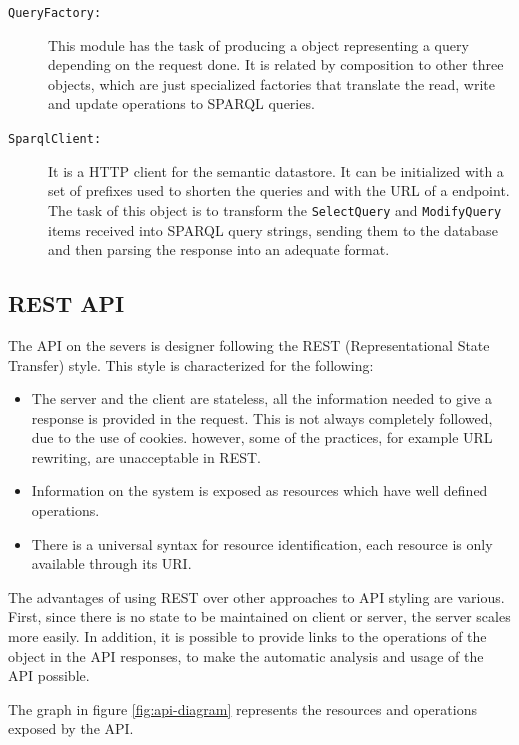 \begin{description}
\item[\texttt{QueryFactory:}] This module has the task of producing a object representing a query depending on the request done. It is related by composition to other three objects, which are just specialized factories that translate the read, write and update operations to SPARQL queries.

\item[\texttt{SparqlClient:}] It is a HTTP client for the semantic datastore. It can be initialized with a set of prefixes used to shorten the queries and with the URL of a endpoint. The task of this object is to transform the \texttt{SelectQuery} and \texttt{ModifyQuery} items received into SPARQL query strings, sending them to the database and then parsing the response into an adequate format.
\end{description}

\FloatBarrier

\subsection{REST API}\label{ssec:api}

The API on the severs is designer following the REST (Representational State Transfer)\cite{rest} style. This style is characterized for the following:

\begin{itemize}
\item The server and the client are stateless, all the information needed to give a response is provided in the request. This is not always completely followed, due to the use of cookies. however, some of the practices, for example URL rewriting, are unacceptable in REST.
\item Information on the system is exposed as resources which have well defined operations.
\item There is a universal syntax for resource identification, each resource is only available through its URI.
\end{itemize}

The advantages of using REST over other approaches to API styling are various. First, since there is no state to be maintained on client or server, the server scales more easily. In addition, it is possible to provide links to the operations of the object in the API responses, to make the automatic analysis and usage of the API possible.

The graph in figure \ref{fig:api-diagram} represents the resources and operations exposed by the API.

